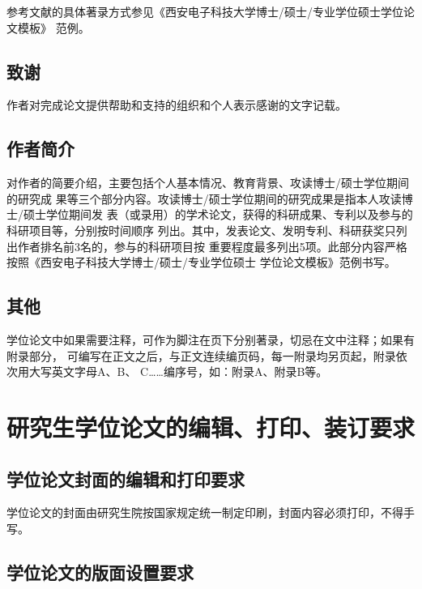 参考文献的具体著录方式参见《西安电子科技大学博士/硕士/专业学位硕士学位论文模板》
范例。

\subsection{致谢}

作者对完成论文提供帮助和支持的组织和个人表示感谢的文字记载。

\subsection{作者简介}

对作者的简要介绍，主要包括个人基本情况、教育背景、攻读博士/硕士学位期间的研究成
果等三个部分内容。攻读博士/硕士学位期间的研究成果是指本人攻读博士/硕士学位期间发
表（或录用）的学术论文，获得的科研成果、专利以及参与的科研项目等，分别按时间顺序
列出。其中，发表论文、发明专利、科研获奖只列出作者排名前3名的，参与的科研项目按
重要程度最多列出5项。此部分内容严格按照《西安电子科技大学博士/硕士/专业学位硕士
学位论文模板》范例书写。

\subsection{其他}

学位论文中如果需要注释，可作为脚注在页下分别著录，切忌在文中注释；如果有附录部分，
可编写在正文之后，与正文连续编页码，每一附录均另页起，附录依次用大写英文字母A、B、
C……编序号，如：附录A、附录B等。

\section{ 研究生学位论文的编辑、打印、装订要求}

\subsection{学位论文封面的编辑和打印要求}

学位论文的封面由研究生院按国家规定统一制定印刷，封面内容必须打印，不得手写。

\subsection{学位论文的版面设置要求}

